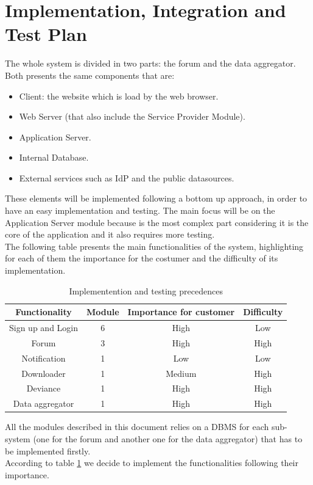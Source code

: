 \section{Implementation, Integration and Test Plan}
The whole system is divided in two parts: the forum and the data aggregator. Both presents the same components that are:
\begin{itemize}
    \item Client: the website which is load by the web browser.
    \item Web Server (that also include the Service Provider Module).
    \item Application Server.
    \item Internal Database.
    \item External services such as IdP and the public datasources.
\end{itemize}
These elements will be implemented following a bottom up approach, in order to have an easy implementation and testing.
The main focus will be on the Application Server module because is the most complex part considering it is the core of the application and it also requires more testing.\\
The following table presents the main functionalities of the system, highlighting for each of them the importance for the costumer and the difficulty of its implementation. 

\begin{table}[h!]
    \caption{Implementention and testing precedences}
    \label{tab:implementention_testing_precedences}
    \centering
    \begin{tabular}{c|c|c|c}
    \rowcolor{gray!50}
    \textbf{Functionality} & \textbf{Module} & \textbf{Importance for customer} & \textbf{Difficulty}\\ \hline\hline
    Sign up and Login & 6 & High & Low\\
    Forum & 3 & High & High\\
    Notification & 1 & Low & Low\\
    Downloader & 1 & Medium & High\\
    Deviance & 1 & High & High\\
    Data aggregator & 1 & High & High\\\hline
    \end{tabular}
\end{table}

All the modules described in this document relies on a DBMS for each sub-system (one for the forum and another one for the data aggregator) that has to be implemented firstly.\\
According to table \ref{tab:implementention_testing_precedences} we decide to implement the functionalities following their importance.

